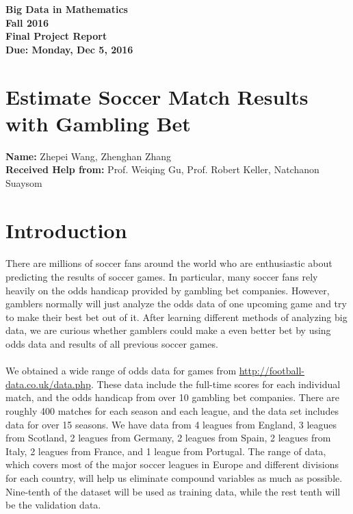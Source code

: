 \documentclass[12pt]{article}
\newcommand{\Name}[1]{\noindent \textbf{Name:} #1 \\}
\newcommand{\Help}[1]{\noindent \textbf{Received Help from:} #1 \\}
\begin{document}
\begin{center}
	\bf
	Big Data in Mathematics \\
	Fall 2016 \\
	\rm
	Final Project Report \\
	Due:  Monday, Dec 5, 2016 \\
\end{center}


\section*{Estimate Soccer Match Results with Gambling Bet}

\Name{Zhepei Wang, Zhenghan Zhang} 
\Help{Prof. Weiqing Gu, Prof. Robert Keller, Natchanon Suaysom}

\section{Introduction}
\paragraph{}
There are millions of soccer fans around the world who are enthusiastic about predicting the results of soccer games. In particular, many soccer fans rely heavily on the odds handicap provided by gambling bet companies. However, gamblers normally will just analyze the odds data of one upcoming game and try to make their best bet out of it. After learning different methods of analyzing big data, we are curious whether gamblers could make a even better bet by using odds data and results of all previous soccer games.
\paragraph{}
We obtained a wide range of odds data for games from \url{http://football-data.co.uk/data.php}. These data include the full-time scores for each individual match, and the odds handicap from over 10 gambling bet companies. There are roughly 400 matches for each season and each league, and the data set includes data for over 15 seasons. We have data from 4 leagues from England, 3 leagues from Scotland, 2 leagues from Germany, 2 leagues from Spain, 2 leagues from Italy, 2 leagues from France, and 1 league from Portugal. The range of data, which covers most of the major soccer leagues in Europe and different divisions for each country, will help us eliminate compound variables  as much as possible. Nine-tenth of the dataset will be used as training data, while the rest tenth will be the validation data.
\end{document}
